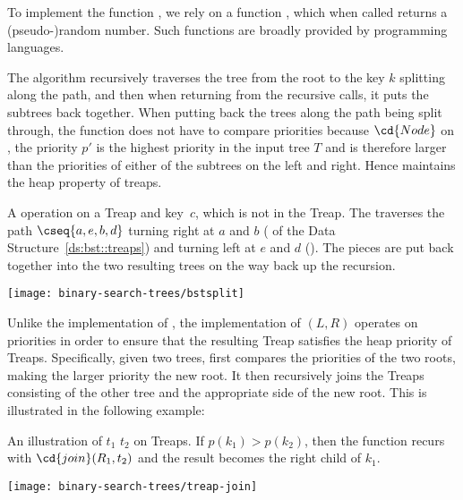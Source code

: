 To implement the function , we rely on a function
, which when called returns a (pseudo-)random number.
Such functions are broadly provided by programming languages.

The  algorithm recursively traverses the tree from the
root to the key $k$ splitting along the path, and then when returning
from the recursive calls, it puts the subtrees back together.  When
putting back the trees along the path being split through, the
function does not have to compare priorities because $\cd{Node}$ on
,
the priority $p'$ is the highest priority in the input tree $T$ and is
therefore larger than the priorities of either of the subtrees on the
left and right.  Hence  maintains the heap property of
treaps.

\begin{example}
A  operation on a Treap and key~$c$, which is not in the
Treap.  The  traverses the path $\cseq{a,e,b,d}$ turning
right at $a$ and $b$ ( of the Data
Structure~\ref{ds:bst::treaps}) and turning left at $e$ and $d$
().  The pieces are put back together into the two
resulting trees on the way back up the recursion.
\begin{center}
  \texttt{[image: binary-search-trees/bstsplit]}
\end{center}
\end{example}

Unlike the implementation of , the implementation of
$(L,R)$ operates on priorities in order to ensure that the
resulting Treap satisfies the heap priority of Treaps.  Specifically,
given two trees,  first compares the priorities of the two
roots, making the larger priority the new root. It then recursively
joins the Treaps consisting of the other tree and the appropriate side
of the new root.  This is illustrated in the following example:
\begin{example}
\label{ex:bst::treap-join}
An illustration of $t_1$ $t_2$ on Treaps.  
%
If $p(k_1) > p(k_2)$, then the function recurs with
$\cd{join}(R_1,t_2)$ and the result becomes the right child of
$k_1$.
\begin{center}
  \texttt{[image: binary-search-trees/treap-join]}
\end{center}
\end{example}

